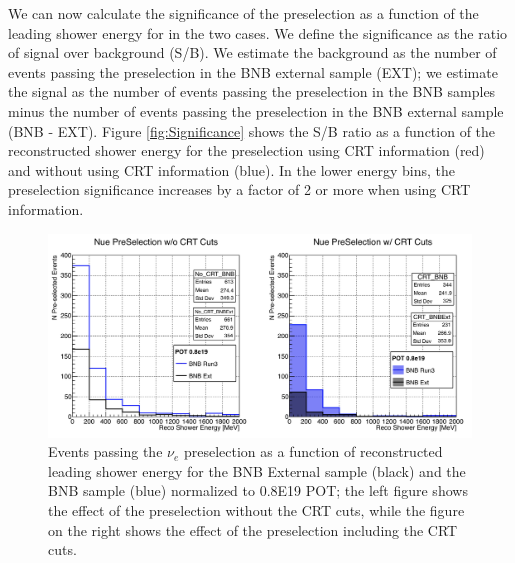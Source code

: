 We can now calculate the significance of the preselection as a function of the leading shower energy for in the two cases.
We define the significance as the ratio of signal over background (S/B). We estimate the background as the number of events passing the preselection in the BNB external sample (EXT); we estimate the signal as the number of events passing the preselection in the BNB samples minus the number of events passing the preselection in the BNB external sample (BNB - EXT). Figure \ref{fig:Significance} shows the S/B ratio as a function of the reconstructed shower energy for the preselection using CRT information (red) and without using CRT information (blue). In the lower energy bins, the preselection significance increases by a factor of 2 or more when using CRT information.

\begin{figure}[h!]
\centering
\includegraphics[scale=0.4]{images/Compare}
\caption{Events passing the $\nu_e$ preselection as a function of reconstructed leading shower energy for the BNB External sample (black) and the BNB sample (blue) normalized to 0.8E19 POT; the left figure shows the effect of the preselection without the CRT cuts, while the figure on the right shows  the effect of the preselection including the CRT cuts. }
\label{fig:SelVsShowerE}
\end{figure}

